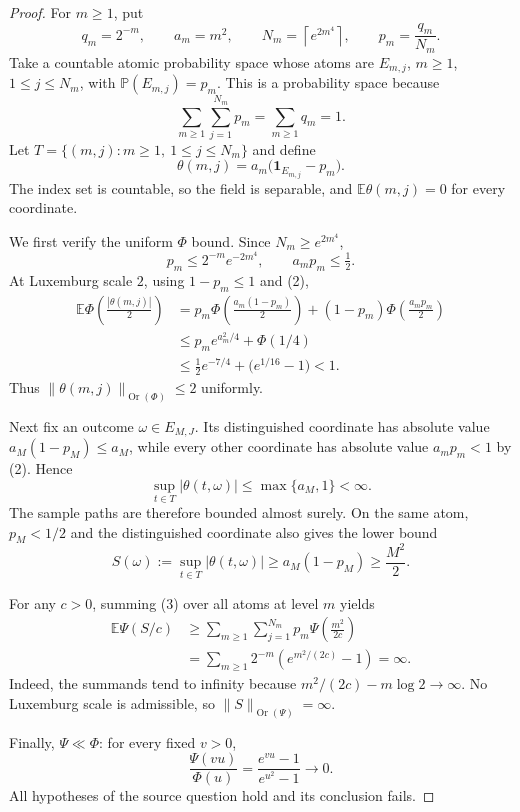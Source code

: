 \documentclass[11pt]{article}
\newcommand{\E}{\mathbb E}
\newcommand{\Pp}{\mathbb P}
\newcommand{\Or}{\operatorname{Or}}
\begin{document}
\begin{proof}
For $m\ge1$, put
\[
 q_m=2^{-m},\qquad a_m=m^2,\qquad
 N_m=\left\lceil e^{2m^4}\right\rceil,
 \qquad p_m=\frac{q_m}{N_m}.
\]
Take a countable atomic probability space whose atoms are
$E_{m,j}$, $m\ge1$, $1\le j\le N_m$, with
$\Pp(E_{m,j})=p_m$. This is a probability space because
\[
 \sum_{m\ge1}\sum_{j=1}^{N_m}p_m
 =\sum_{m\ge1}q_m=1.
\]
Let $T=\{(m,j):m\ge1,\ 1\le j\le N_m\}$ and define
\[
 \theta(m,j)=a_m\bigl(\mathbf1_{E_{m,j}}-p_m\bigr).
 \tag{1}
\]
The index set is countable, so the field is separable, and
$\E\theta(m,j)=0$ for every coordinate.

We first verify the uniform $\Phi$ bound. Since
$N_m\ge e^{2m^4}$,
\[
 p_m\le 2^{-m}e^{-2m^4},
 \qquad
 a_mp_m\le\tfrac12.
 \tag{2}
\]
At Luxemburg scale $2$, using $1-p_m\le1$ and (2),
\begin{align*}
 \E\Phi\!\left(\frac{|\theta(m,j)|}{2}\right)
 &=p_m\Phi\!\left(\frac{a_m(1-p_m)}2\right)
 +(1-p_m)\Phi\!\left(\frac{a_mp_m}2\right)\\
 &\le p_m e^{a_m^2/4}+\Phi(1/4)\\
 &\le \tfrac12e^{-7/4}+\bigl(e^{1/16}-1\bigr)<1.
\end{align*}
Thus $\|\theta(m,j)\|_{\Or(\Phi)}\le2$ uniformly.

\newpage
Next fix an outcome $\omega\in E_{M,J}$. Its distinguished coordinate has
absolute value $a_M(1-p_M)\le a_M$, while every other coordinate has absolute
value $a_mp_m<1$ by (2). Hence
\[
 \sup_{t\in T}|\theta(t,\omega)|\le\max\{a_M,1\}<\infty.
\]
The sample paths are therefore bounded almost surely. On the same atom,
$p_M<1/2$ and the distinguished coordinate also gives the lower bound
\[
 S(\omega):=\sup_{t\in T}|\theta(t,\omega)|
 \ge a_M(1-p_M)\ge\frac{M^2}{2}.
 \tag{3}
\]

For any $c>0$, summing (3) over all atoms at level $m$ yields
\begin{align*}
 \E\Psi(S/c)
 &\ge\sum_{m\ge1}\sum_{j=1}^{N_m}
 p_m\Psi\!\left(\frac{m^2}{2c}\right)\\
 &=\sum_{m\ge1}2^{-m}
 \left(e^{m^2/(2c)}-1\right)=\infty.
\end{align*}
Indeed, the summands tend to infinity because
$m^2/(2c)-m\log2\to\infty$. No Luxemburg scale is admissible, so
$\|S\|_{\Or(\Psi)}=\infty$.

Finally, $\Psi\ll\Phi$: for every fixed $v>0$,
\[
 \frac{\Psi(vu)}{\Phi(u)}
 =\frac{e^{vu}-1}{e^{u^2}-1}\longrightarrow0.
\]
All hypotheses of the source question hold and its conclusion fails.
\end{proof}
\end{document}
